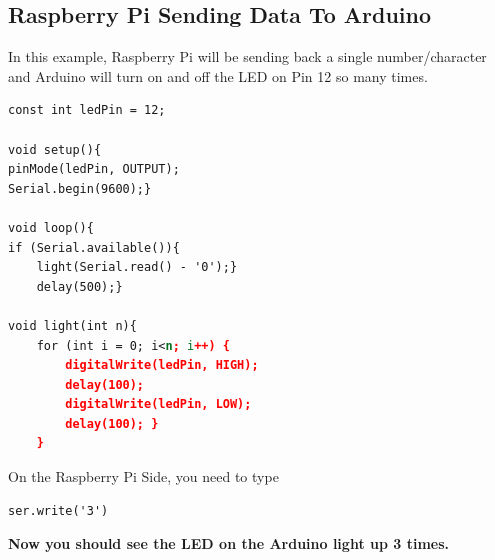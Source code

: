 \subsection{Raspberry Pi Sending Data To Arduino}
In this example, Raspberry Pi will be sending back a single number/character and Arduino will turn on and off the LED on Pin 12 so many times.
\begin{lstlisting}[language=XML]
const int ledPin = 12;

void setup(){
pinMode(ledPin, OUTPUT);
Serial.begin(9600);}

void loop(){
if (Serial.available()){
	light(Serial.read() - '0');}
	delay(500);}
	
void light(int n){
	for (int i = 0; i<n; i++) {
		digitalWrite(ledPin, HIGH);
		delay(100);
		digitalWrite(ledPin, LOW);
		delay(100); } 
	}
\end{lstlisting}
On the Raspberry Pi Side, you need to type
\begin{lstlisting}[language=XML]
ser.write('3')
\end{lstlisting}
\textbf{Now you should see the LED on the Arduino light up 3 times.}